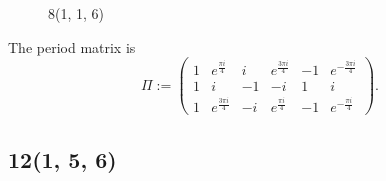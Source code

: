 \documentclass[12pt,reqno]{amsart}
\DeclareMathOperator{\Aut}{Aut}
\theoremstyle{definition}
\theoremstyle{remark}
\begin{document}
\begin{figure}[htbp]
    \centering
    \qquad
    \caption{8(1, 1, 6)}%
    \label{fig:116}%
\end{figure}

The period matrix is 
$$\Pi := \begin{pmatrix}
 1 & e^{\frac{\pi i}{4}} & i & e^{\frac{3 \pi i}{4}} & -1 & e^{-\frac{3 \pi i}{4}} \\
 1 & i & -1 & -i & 1 & i \\
 1 & e^{\frac{3 \pi i}{4}} & -i & e^{\frac{\pi i}{4}} & -1 & e^{-\frac{\pi i}{4}} \end{pmatrix}.$$ 
 


\subsection{12(1, 5, 6)}
\end{document}
